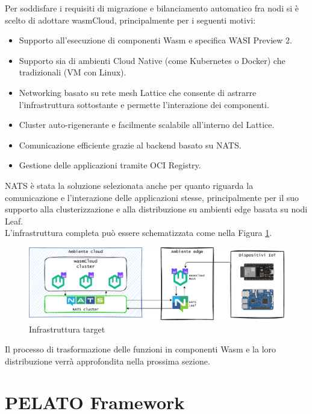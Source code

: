 Per soddisfare i requisiti di migrazione e bilanciamento automatico fra nodi si è scelto di adottare wasmCloud, principalmente per i seguenti motivi:
\begin{itemize}
    \item Supporto all'esecuzione di componenti Wasm e specifica WASI Preview 2.
    \item Supporto sia di ambienti Cloud Native (come Kubernetes o Docker) che tradizionali (VM con Linux).
    \item Networking basato su rete mesh Lattice che consente di astrarre l'infrastruttura sottostante e permette l'interazione dei componenti.
    \item Cluster auto-rigenerante e facilmente scalabile all'interno del Lattice.
    \item Comunicazione efficiente grazie al backend basato su NATS.
    \item Gestione delle applicazioni tramite OCI Registry.
\end{itemize}

NATS è stata la soluzione selezionata anche per quanto riguarda la comunicazione e l'interazione delle applicazioni stesse, principalmente per il suo supporto alla clusterizzazione e alla distribuzione su ambienti edge basata su nodi Leaf.\\
L'infrastruttura completa può essere schematizzata come nella Figura \ref{fig:infra_wasmcloud_nats}.

\FloatBarrier
\begin{figure}[h]
    \centering
    \includegraphics[width=\textwidth]{img/schemi/schemi-architettura-infra.drawio.pdf}
    \caption{Infrastruttura target}
    \label{fig:infra_wasmcloud_nats}
\end{figure}
\FloatBarrier

Il processo di trasformazione delle funzioni in componenti Wasm e la loro distribuzione verrà approfondita nella prossima sezione.

\section{PELATO Framework}

